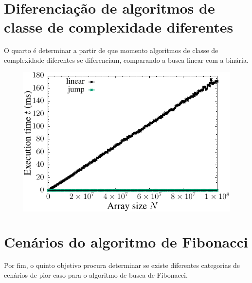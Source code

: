 \section{Diferenciação de algoritmos de classe de complexidade diferentes}

O quarto é determinar a partir de que momento algoritmos de classe de complexidade diferentes se diferenciam, comparando a busca linear com a binária.

\begin{figure}[H]
  \centering
  \includegraphics[scale=1.2]{../plots/lvsj_search_time.pdf}
\end{figure} \label{fig:lvsj_search_time}

\section{Cenários do algoritmo de Fibonacci}

Por fim, o quinto objetivo procura determinar se existe diferentes categorias de cenários de pior caso para o algoritmo de busca de Fibonacci.

